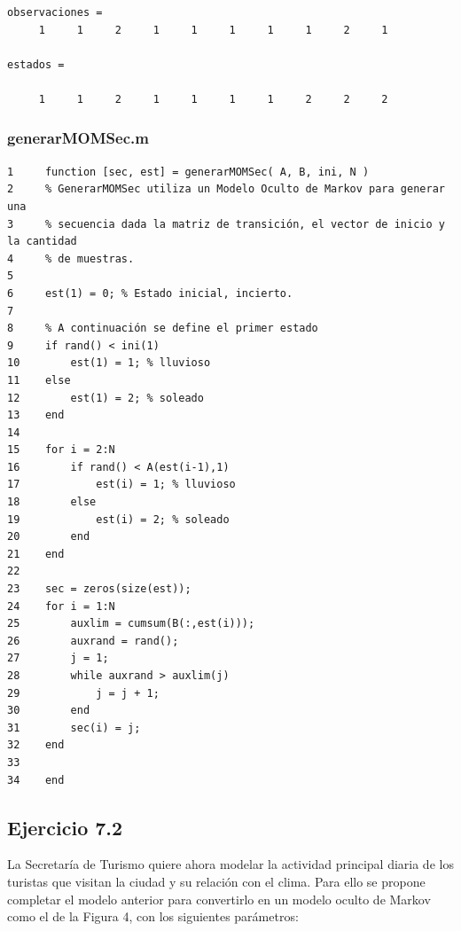 \documentclass[11pt,a4paper,final]{article}
\begin{document}
\begin{verbatim}
observaciones =
     1     1     2     1     1     1     1     1     2     1

estados =

     1     1     2     1     1     1     1     2     2     2
\end{verbatim}
    

\subsubsection*{generarMOMSec.m}

\begin{verbatim}
1     function [sec, est] = generarMOMSec( A, B, ini, N )
2     % GenerarMOMSec utiliza un Modelo Oculto de Markov para generar una 
3     % secuencia dada la matriz de transición, el vector de inicio y la cantidad
4     % de muestras.
5     
6     est(1) = 0; % Estado inicial, incierto.
7     
8     % A continuación se define el primer estado
9     if rand() < ini(1)
10        est(1) = 1; % lluvioso
11    else
12        est(1) = 2; % soleado
13    end
14    
15    for i = 2:N
16        if rand() < A(est(i-1),1)
17            est(i) = 1; % lluvioso
18        else
19            est(i) = 2; % soleado
20        end
21    end
22    
23    sec = zeros(size(est));
24    for i = 1:N
25        auxlim = cumsum(B(:,est(i)));
26        auxrand = rand();
27        j = 1;
28        while auxrand > auxlim(j)
29            j = j + 1;
30        end
31        sec(i) = j;
32    end
33        
34    end
\end{verbatim}
    

\subsection{Ejercicio 7.2}


La Secretaría de Turismo quiere ahora modelar la actividad principal diaria de los turistas que visitan la ciudad y su relación con el clima. Para ello se propone completar el modelo anterior para convertirlo en un modelo oculto de Markov como el de la Figura 4, con los siguientes parámetros:
\end{document}
